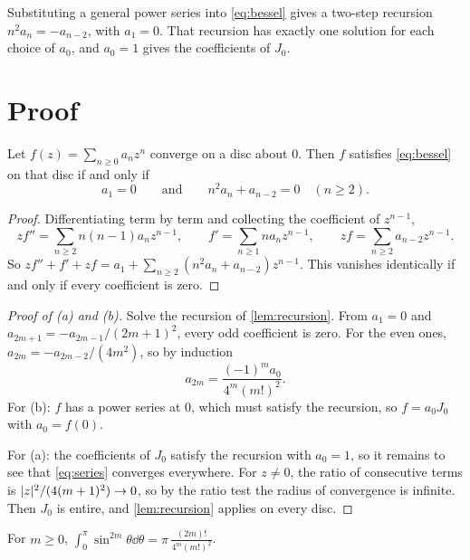 \documentclass[11pt,a4paper]{article}
\begin{document}
Substituting a general power series into \eqref{eq:bessel} gives a two-step
recursion $n^2 a_n = -a_{n-2}$, with $a_1 = 0$. That recursion has exactly one
solution for each choice of $a_0$, and $a_0 = 1$ gives the coefficients of $J_0$.

\section{Proof}

\begin{lemma}\label{lem:recursion}
  Let $f(z) = \sum_{n \geq 0} a_n z^n$ converge on a disc about $0$. Then $f$
  satisfies \eqref{eq:bessel} on that disc if and only if
  \[
    a_1 = 0 \qquad\text{and}\qquad n^2 a_n + a_{n-2} = 0 \quad (n \geq 2).
  \]
\end{lemma}

\begin{proof}
  Differentiating term by term and collecting the coefficient of $z^{n-1}$,
  \[
    z f'' = \sum_{n \geq 2} n(n-1) a_n z^{n-1}, \qquad
    f' = \sum_{n \geq 1} n a_n z^{n-1}, \qquad
    z f = \sum_{n \geq 2} a_{n-2} z^{n-1}.
  \]
  So $z f'' + f' + z f = a_1 + \sum_{n \geq 2} (n^2 a_n + a_{n-2}) z^{n-1}$. This
  vanishes identically if and only if every coefficient is zero.
\end{proof}

\begin{proof}[Proof of (a) and (b)]
  Solve the recursion of \cref{lem:recursion}. From $a_1 = 0$ and
  $a_{2m+1} = -a_{2m-1}/(2m+1)^2$, every odd coefficient is zero. For the even ones,
  $a_{2m} = -a_{2m-2} / (4m^2)$, so by induction
  \[
    a_{2m} = \frac{(-1)^m a_0}{4^m (m!)^2}.
  \]
  For (b): $f$ has a power series at $0$, which must satisfy the recursion, so
  $f = a_0 J_0$ with $a_0 = f(0)$.

  For (a): the coefficients of $J_0$ satisfy the recursion with $a_0 = 1$, so it
  remains to see that \eqref{eq:series} converges everywhere. For $z \neq 0$, the
  ratio of consecutive terms is $\lvert z\rvert^2 / (4(m+1)^2) \to 0$, so by the ratio test
  the radius of convergence is infinite. Then $J_0$ is entire, and
  \cref{lem:recursion} applies on every disc.
\end{proof}

\begin{lemma}[Wallis]\label{lem:wallis}
  For $m \geq 0$,
  $\displaystyle\int_0^\pi \sin^{2m}\theta \dd\theta = \pi \, \frac{(2m)!}{4^m (m!)^2}$.
\end{lemma}
\end{document}

